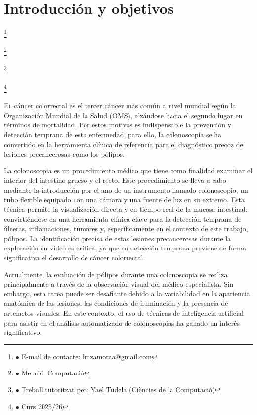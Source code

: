 ﻿\documentclass[10pt,a4paper,twocolumn,twoside]{article}
\newcommand\blfootnote[1]{%
  \begingroup
  \renewcommand\thefootnote{}\footnote{#1}%
  \addtocounter{footnote}{-1}%
  \endgroup
}
\begin{document}
\section{Introducción y objetivos}

\blfootnote{$\bullet$ E-mail de contacte: lmzamoraa@gmail.com}
\blfootnote{$\bullet$ Menció: Computació}
\blfootnote{$\bullet$ Treball tutoritzat per: Yael Tudela (Ciències de la Computació)}
\blfootnote{$\bullet$ Curs 2025/26}

\lettrine[lines=3]{E}{l} cáncer colorrectal es el tercer cáncer más común a nivel mundial según la Organización Mundial de la Salud (OMS)\cite{who_colorectal_2024}, alzándose hacia el segundo lugar en términos de mortalidad. Por estos motivos es indispensable la prevención y detección temprana de esta enfermedad, para ello, la colonoscopia se ha convertido en la herramienta clínica de referencia para el diagnóstico precoz de lesiones precancerosas como los pólipos.

La colonoscopia\cite{mayoclinic_colonoscopia} es un procedimiento médico que tiene como finalidad examinar el interior del intestino grueso y el recto. Este procedimiento se lleva a cabo mediante la introducción por el ano de un instrumento llamado colonoscopio, un tubo flexible equipado con una cámara y una fuente de luz en su extremo. Esta técnica permite la visualización directa y en tiempo real de la mucosa intestinal, convirtiéndose en una herramienta clínica clave para la detección temprana de úlceras, inflamaciones, tumores y, específicamente en el contexto de este trabajo, pólipos. La identificación precisa de estas lesiones precancerosas durante la exploración en vídeo es crítica, ya que su detección temprana previene de forma significativa el desarrollo de cáncer colorrectal.

Actualmente, la evaluación de pólipos durante una colonoscopia se realiza principalmente a través de la observación visual del médico especialista. Sin embargo, esta tarea puede ser desafiante debido a la variabilidad en la apariencia anatómica de las lesiones, las condiciones de iluminación y la presencia de artefactos visuales. En este contexto, el uso de técnicas de inteligencia artificial para asistir en el análisis automatizado de colonoscopias ha ganado un interés significativo.
\end{document}
